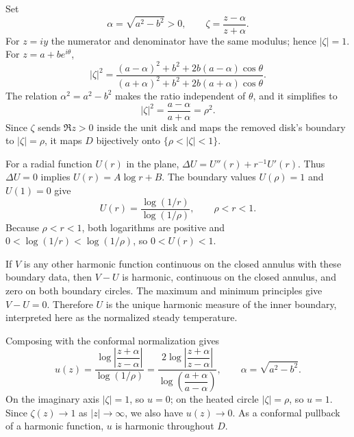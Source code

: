 

\begin{solution}Set
\[
\alpha=\sqrt{a^2-b^2}>0,
\qquad
\zeta=\frac{z-\alpha}{z+\alpha}.
\]
For $z=iy$ the numerator and denominator have the same modulus; hence
$|\zeta|=1$. For $z=a+be^{i\theta}$,
\[
|\zeta|^2
=\frac{(a-\alpha)^2+b^2+2b(a-\alpha)\cos\theta}
{(a+\alpha)^2+b^2+2b(a+\alpha)\cos\theta}.
\]
The relation $\alpha^2=a^2-b^2$ makes the ratio independent of
$\theta$, and it simplifies to
\[
|\zeta|^2=\frac{a-\alpha}{a+\alpha}=\rho^2.
\]
Since $\zeta$ sends $\Re z>0$ inside the unit disk and maps the
removed disk's boundary to $|\zeta|=\rho$, it maps $D$ bijectively
onto $\{\rho<|\zeta|<1\}$.

For a radial function $U(r)$ in the plane,
$\Delta U=U''(r)+r^{-1}U'(r)$. Thus $\Delta U=0$ implies
$U(r)=A\log r+B$. The boundary values
$U(\rho)=1$ and $U(1)=0$ give
\[
\boxed{\quad U(r)=\frac{\log(1/r)}{\log(1/\rho)},
\qquad \rho<r<1.\quad}
\]
Because $\rho<r<1$, both logarithms are positive and
$0<\log(1/r)<\log(1/\rho)$, so $0<U(r)<1$.

If $V$ is any other harmonic function continuous on the closed annulus
with these boundary data, then $V-U$ is harmonic, continuous on the
closed annulus, and zero on both boundary circles. The maximum and
minimum principles give $V-U=0$. Therefore $U$ is the unique harmonic
measure of the inner boundary, interpreted here as the normalized steady
temperature.

Composing with the conformal normalization gives
\[
u(z)=\frac{\log\left|\dfrac{z+\alpha}{z-\alpha}\right|}
{\log(1/\rho)}
=\boxed{\frac{2\log\left|\dfrac{z+\alpha}{z-\alpha}\right|}
{\log\left(\dfrac{a+\alpha}{a-\alpha}\right)}},
\qquad \alpha=\sqrt{a^2-b^2}.
\]
On the imaginary axis $|\zeta|=1$, so $u=0$; on the heated circle
$|\zeta|=\rho$, so $u=1$. Since $\zeta(z)\to1$ as
$|z|\to\infty$, we also have $u(z)\to0$. As a conformal pullback
of a harmonic function, $u$ is harmonic throughout $D$.
\end{solution}


